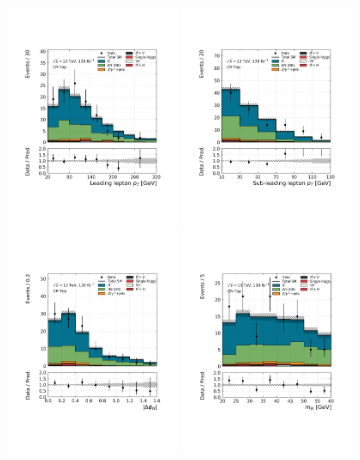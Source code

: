 \begin{figure}[!htb]
    \centering
    \includegraphics[width=0.4\textwidth]{figures/search_hh/bkg_estimate/crvr/crtop/crtoptest_l0_pt}
    \includegraphics[width=0.4\textwidth]{figures/search_hh/bkg_estimate/crvr/crtop/crtoptest_l1_pt}
    \includegraphics[width=0.4\textwidth]{figures/search_hh/bkg_estimate/crvr/crtop/crtoptest_dphi_ll}
    \includegraphics[width=0.4\textwidth]{figures/search_hh/bkg_estimate/crvr/crtop/crtoptest_mll}

\end{figure}
